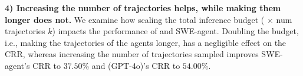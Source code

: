 \noindent\textbf{4) Increasing the number of trajectories helps, while making them longer does not.}
We examine how scaling the total inference budget (\maxcalls{} $\times$ num trajectories $k$) impacts the performance of \cresearcher{} and SWE-agent.
Doubling the \maxcalls{} budget, i.e., making the trajectories of the agents longer, has a negligible effect on the CRR, whereas
increasing the number of trajectories sampled improves SWE-agent's CRR to $37.50\%$ and \cresearcher{} (GPT-4o)'s CRR to $54.00\%$.
